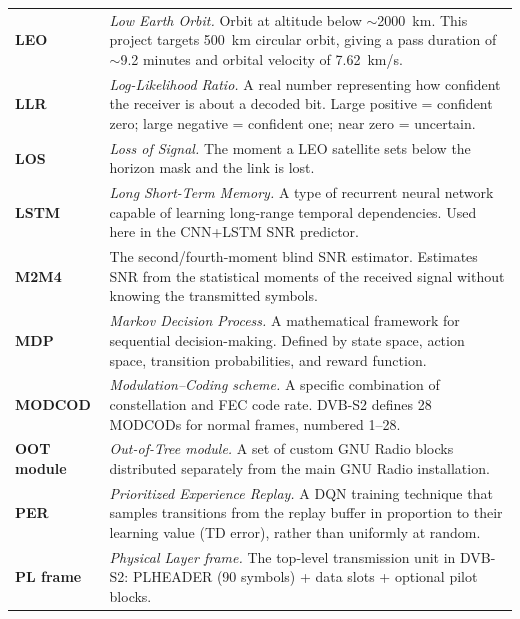 \documentclass[12pt,a4paper]{report}
\begin{document}
\begin{longtable}{p{3.2cm}p{10.5cm}}
\textbf{LEO} & \textit{Low Earth Orbit.}  Orbit at altitude below $\sim$2000~km.
    This project targets 500~km circular orbit, giving a pass duration of
    $\sim$9.2 minutes and orbital velocity of 7.62~km/s. \\[4pt]

\textbf{LLR} & \textit{Log-Likelihood Ratio.}  A real number representing how
    confident the receiver is about a decoded bit.  Large positive = confident
    zero; large negative = confident one; near zero = uncertain. \\[4pt]

\textbf{LOS} & \textit{Loss of Signal.}  The moment a LEO satellite sets below
    the horizon mask and the link is lost. \\[4pt]

\textbf{LSTM} & \textit{Long Short-Term Memory.}  A type of recurrent neural
    network capable of learning long-range temporal dependencies.  Used here
    in the CNN+LSTM SNR predictor. \\[4pt]

\textbf{M2M4} & The second/fourth-moment blind SNR estimator.  Estimates SNR
    from the statistical moments of the received signal without knowing the
    transmitted symbols. \\[4pt]

\textbf{MDP} & \textit{Markov Decision Process.}  A mathematical framework
    for sequential decision-making.  Defined by state space, action space,
    transition probabilities, and reward function. \\[4pt]

\textbf{MODCOD} & \textit{Modulation--Coding scheme.}  A specific combination
    of constellation and FEC code rate.  DVB-S2 defines 28 MODCODs for normal
    frames, numbered 1--28. \\[4pt]

\textbf{OOT module} & \textit{Out-of-Tree module.}  A set of custom GNU Radio
    blocks distributed separately from the main GNU Radio installation. \\[4pt]

\textbf{PER} & \textit{Prioritized Experience Replay.}  A DQN training technique
    that samples transitions from the replay buffer in proportion to their
    learning value (TD error), rather than uniformly at random. \\[4pt]

\textbf{PL frame} & \textit{Physical Layer frame.}  The top-level transmission
    unit in DVB-S2: PLHEADER (90 symbols) + data slots + optional pilot blocks. \\[4pt]


\end{longtable}
\end{document}
